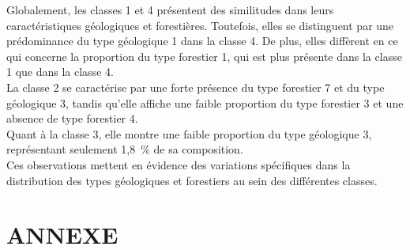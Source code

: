 \documentclass{article}
\begin{document}
Globalement, les classes 1 et 4 présentent des similitudes dans leurs caractéristiques géologiques et forestières. Toutefois, elles se distinguent par une prédominance du type géologique 1 dans la classe 4. De plus, elles diffèrent en ce qui concerne la proportion du type forestier 1, qui est plus présente dans la classe 1 que dans la classe 4.
\\
La classe 2 se caractérise par une forte présence du type forestier 7 et du type géologique 3, tandis qu'elle affiche une faible proportion du type forestier 3 et une absence de type forestier 4.
\\
Quant à la classe 3, elle montre une faible proportion du type géologique 3, représentant seulement 1,8~\% de sa composition.
\\
Ces observations mettent en évidence des variations spécifiques dans la distribution des types géologiques et forestiers au sein des différentes classes.


\newpage
\section{ANNEXE}
\end{document}
